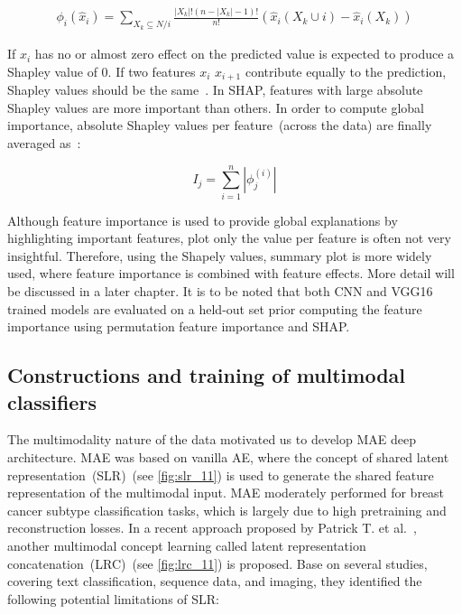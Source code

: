\vspace{-2mm}
\begin{align}
    \phi_{i}(\hat x_i)=\sum_{X_k \subseteq N / i} \frac{|X_k| !(n-|X_k|-1) !}{n !}(\hat x_i(X_k \cup i)-\hat x_i(X_k))
    \label{eq:shap}
\end{align}

\hspace*{3.5mm} If $x_i$ has no or almost zero effect on the predicted value is expected to produce a Shapley value of 0. If two features $x_i$ $x_{i+1}$ contribute equally to the prediction, Shapley values should be the same~\cite{NIPS2017_7062}. In SHAP, features with large absolute Shapley values are more important than others. In order to compute global importance, absolute Shapley values per feature~(across the data) are finally averaged as~\cite{NIPS2017_7062}:

\begin{equation}
    I_{j}=\sum_{i=1}^{n}\left|\phi_{j}^{(i)}\right|
\end{equation}

\hspace*{3.5mm} Although feature importance is used to provide global explanations by highlighting important features, plot only the value per feature is often not very insightful. Therefore, using the Shapely values, summary plot is more widely used, where feature importance is combined with feature effects. More detail will be discussed in a later chapter. It is to be noted that both CNN and VGG16 trained models are evaluated on a held-out set prior computing the feature importance using permutation feature importance and SHAP.

\subsection{Constructions and training of multimodal classifiers}
The multimodality nature of the data motivated us to develop MAE deep architecture. MAE was based on vanilla AE, where the concept of shared latent representation~(SLR)~(see \cref{fig:slr_11}) is used to generate the shared feature representation of the multimodal input. MAE moderately performed for breast cancer subtype classification tasks, which is largely due to high pretraining and reconstruction losses.
In a recent approach proposed by Patrick T. et al.~\cite{mmdcae}, another multimodal concept learning called latent representation concatenation~(LRC)~(see \cref{fig:lrc_11}) is proposed. Base on several studies, covering text classification, sequence data, and imaging, they identified the following potential limitations of SLR: 

